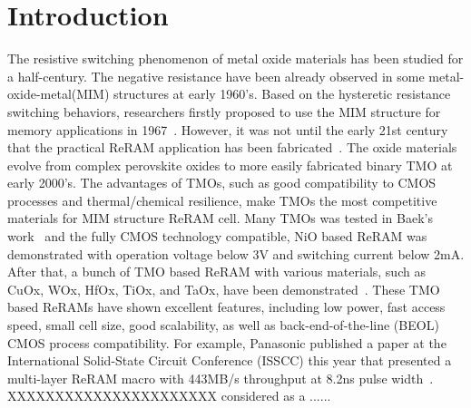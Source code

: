 \section{Introduction} \label{sec:intro}

The resistive switching phenomenon of metal oxide materials has been studied for a half-century. The negative resistance have been already observed in some metal-oxide-metal(MIM) structures at early 1960's. Based on the hysteretic resistance switching behaviors, researchers firstly proposed to use the MIM structure for memory applications in 1967~\cite{first1,first2}. However, it was not until the early 21st century that the practical ReRAM application has been fabricated~\cite{fab1,fab2}. The oxide materials evolve from complex perovskite oxides to more easily fabricated binary TMO at early 2000's. The advantages of TMOs, such as good compatibility to CMOS processes and thermal/chemical resilience, make TMOs the most competitive materials for MIM structure ReRAM cell. Many TMOs was tested in Baek's work~\cite{fab2} and the fully CMOS technology compatible, NiO based ReRAM was demonstrated with operation voltage below 3V and switching current below 2mA. After that, a bunch of TMO based ReRAM with various materials, such as CuOx, WOx, HfOx, TiOx, and TaOx, have been demonstrated~\cite{CuOx,WOx,HfOx,TiTa,TaOx,TaOx433}. These TMO based ReRAMs have shown excellent features, including low power, fast access speed, small cell size, good scalability, as well as back-end-of-the-line (BEOL) CMOS process compatibility. For example, Panasonic published a paper at the International Solid-State Circuit Conference (ISSCC) this year that presented a multi-layer ReRAM macro with 443MB/s throughput at 8.2ns pulse width~\cite{TaOx433}. XXXXXXXXXXXXXXXXXXXXXX considered as a ......

